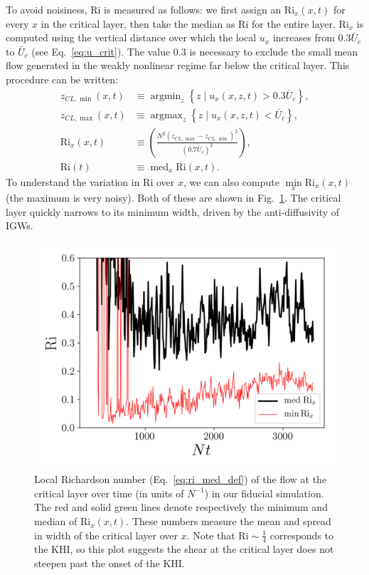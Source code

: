 \documentclass[
        fleqn,
        usenatbib,
        referee,
    ]{mnras}
\newcommand*{\p}[1]{\left(#1\right)}
\newcommand*{\z}[1]{\left\{#1\right\}}
\DeclareMathOperator*{\argmin}{argmin}
\DeclareMathOperator*{\argmax}{argmax}
\DeclareMathOperator*{\med}{med}
\begin{document}
To avoid noisiness, $\mathrm{Ri}$ is measured as follows: we first assign an
$\mathrm{Ri}_x(x, t)$ for every $x$ in the critical layer, then take the median
as $\mathrm{Ri}$ for the entire layer. $\mathrm{Ri}_x$ is computed using the
vertical distance over which the local $u_x$ increases from $0.3\bar{U}_c$ to
$\bar{U}_c$ (see Eq.~\eqref{eq:u_crit}). The value $0.3$ is necessary to exclude
the small mean flow generated in the weakly nonlinear regime far below the
critical layer. This procedure can be written:
\begin{align}
    z_{CL, \min}(x, t) &\equiv \argmin_z
        \z{z\mid u_x(x, z, t) > 0.3\overline{U}_c},\\
    z_{CL, \max}(x, t) &\equiv \argmax_z
        \z{z\mid u_x(x, z, t) < \overline{U}_c},\\
    \mathrm{Ri}_x(x, t) &\equiv
        \p{\frac{N^2 \p{z_{CL, \max} - z_{CL, \min}}^2}{(0.7
            \overline{U}_c)^2}},\\
    \mathrm{Ri}(t) &\equiv \med_x\mathrm{Ri}\p{x, t}.\label{eq:ri_med_def}
\end{align}
To understand the variation in $\mathrm{Ri}$ over $x$, we can also compute
$\min\limits_x \mathrm{Ri}_x(x, t)$ (the maximum is very noisy). Both of these
are shown in Fig.~\ref{fig:nl_f_ri}. The critical layer quickly narrows to its
minimum width, driven by the anti-diffusivity of IGWs.
\begin{figure}
    \centering
    \includegraphics[width=0.9\columnwidth]{plots/nl_f_ri.png}
    \caption{Local Richardson number (Eq.~\eqref{eq:ri_med_def}) of the flow at
    the critical layer over time (in units of $N^{-1}$) in our fiducial
    simulation. The red and solid green lines denote respectively the minimum
    and median of $\mathrm{Ri}_x(x, t)$. These numbers measure the mean and
    spread in width of the critical layer over $x$. Note that $\mathrm{Ri} \sim
    \frac{1}{4}$ corresponds to the KHI, so this plot suggests the shear at the
    critical layer does not steepen past the onset of the
    KHI.}\label{fig:nl_f_ri}
\end{figure}
\end{document}
